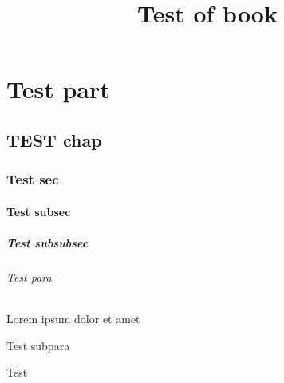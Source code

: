 \documentclass[12pt]{book}
\title{Test of book}
\begin{document}
    \tableofcontents
    
    
    \part{Test part}
    
    \chapter{TEST chap}
    \section{Test sec}
    \subsection{Test subsec}
    \subsubsection{Test subsubsec}
    \paragraph{Test para} Lorem ipsum dolor et amet
    \subparagraph{Test subpara}
    Test
\end{document}
